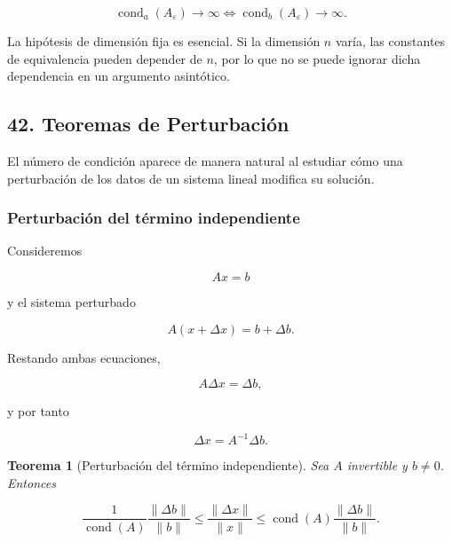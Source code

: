 \documentclass[12pt]{article}
\DeclareMathOperator{\cond}{cond}
\newtheorem{teorema}{Teorema}
\begin{document}
\[
    \boxed{
    \cond_a(A_\varepsilon)\to\infty
    \iff
    \cond_b(A_\varepsilon)\to\infty.
    }
\]

\begin{observacion}
La hipótesis de dimensión fija es esencial. Si la dimensión $n$ varía,
las constantes de equivalencia pueden depender de $n$, por lo que no
se puede ignorar dicha dependencia en un argumento asintótico.
\end{observacion}


\subsection*{42. Teoremas de Perturbación}

El número de condición aparece de manera natural al estudiar cómo una
perturbación de los datos de un sistema lineal modifica su solución.


\subsubsection*{Perturbación del término independiente}

Consideremos

\[
    Ax=b
\]

y el sistema perturbado

\[
    A(x+\Delta x)=b+\Delta b.
\]

Restando ambas ecuaciones,

\[
    A\Delta x=\Delta b,
\]

y por tanto

\[
    \Delta x=A^{-1}\Delta b.
\]

\begin{teorema}[Perturbación del término independiente]
Sea $A$ invertible y $b\neq0$. Entonces

\[
    \boxed{
    \frac{1}{\cond(A)}
    \frac{\|\Delta b\|}{\|b\|}
    \leq
    \frac{\|\Delta x\|}{\|x\|}
    \leq
    \cond(A)
    \frac{\|\Delta b\|}{\|b\|}.
    }
\]
\end{teorema}
\end{document}
